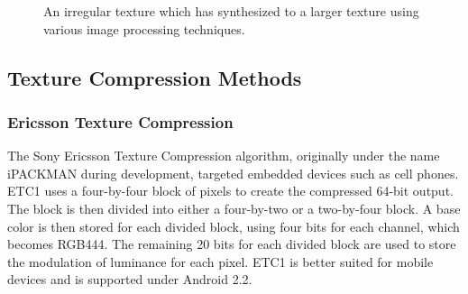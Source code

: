 \documentclass[12pt]{CPP}
\begin{document}
\begin{figure}[!htbp]
   \begin{center}
   \caption{An irregular texture which has synthesized to a larger texture using various image processing techniques.}
   \end{center}
\end{figure}

\subsection{Texture Compression Methods}
\subsubsection{Ericsson Texture Compression}
The Sony Ericsson Texture Compression algorithm, originally under the name iPACKMAN during development, targeted embedded devices such as cell phones. ETC1 uses a four-by-four block of pixels to create the compressed 64-bit output. The block is then divided into either a four-by-two or a two-by-four block. A base color is then stored for each divided block, using four bits for each channel, which becomes RGB444. The remaining 20 bits for each divided block are used to store the modulation of luminance for each pixel. ETC1 is better suited for mobile devices and is supported under Android 2.2.
\end{document}

